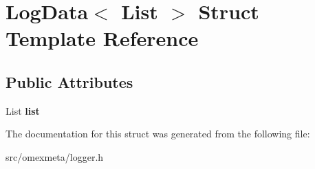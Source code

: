 \hypertarget{structLogData}{}\section{Log\+Data$<$ List $>$ Struct Template Reference}
\label{structLogData}
\subsection*{Public Attributes}
\begin{DoxyCompactItemize}
\item 
\mbox{\label{structLogData_added55423a3b24a6ef757e8f749795ea}} 
List {\bfseries list}
\end{DoxyCompactItemize}


The documentation for this struct was generated from the following file\+:\begin{DoxyCompactItemize}
\item 
src/omexmeta/logger.\+h\end{DoxyCompactItemize}
